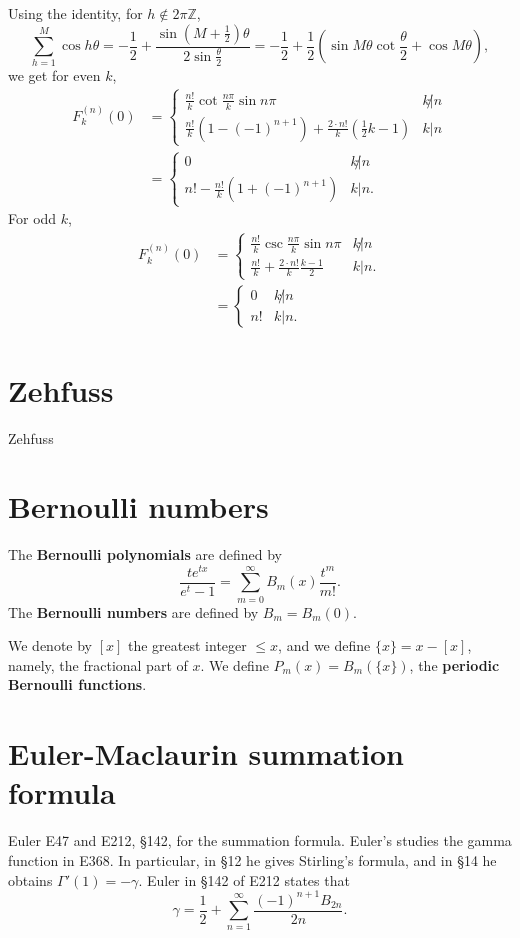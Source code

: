 \documentclass{amsart}
\begin{document}
Using the identity, for $h \not \in 2\pi \mathbb{Z}$,
\[
\sum_{h=1}^M \cos h\theta = - \frac{1}{2}+\frac{\sin\left(M+\frac{1}{2}\right)\theta}{2\sin\frac{\theta}{2}}
=-\frac{1}{2}+\frac{1}{2}\left(\sin M\theta \cot \frac{\theta}{2}+\cos M \theta\right),
\] 
we  get for even $k$,
\begin{align*}
F_k^{(n)}(0) &= \begin{cases}
\frac{n!}{k} \cot \frac{n\pi}{k} \sin n\pi&k \not | n\\
\frac{n!}{k}(1-(-1)^{n+1})
+\frac{2\cdot n!}{k} \left(\frac{1}{2}k-1\right)
&k  | n
\end{cases}\\
&=\begin{cases}
0&k \not | n\\
n!-\frac{n!}{k}(1+(-1)^{n+1})& k| n.
\end{cases}
\end{align*}
For odd $k$,
\begin{align*}
F_k^{(n)}(0) 
&=\begin{cases}
\frac{n!}{k} \csc \frac{n\pi}{k} \sin n\pi&k \not | n\\
\frac{n!}{k}+\frac{2\cdot n!}{k} \frac{k-1}{2}&k | n.
\end{cases}\\
&=\begin{cases}
0&k \not | n\\
n!&k|n.
\end{cases}
\end{align*}



\section{Zehfuss}
Zehfuss \cite{zehfuss}

\section{Bernoulli numbers}
The \textbf{Bernoulli polynomials} are defined by
\[
\frac{te^{tx}}{e^t-1} = \sum_{m=0}^\infty B_m(x) \frac{t^m}{m!}.
\]
The \textbf{Bernoulli numbers} are defined by $B_m=B_m(0)$. 

We denote by $[x]$ the greatest integer $\leq x$, and we define $\{x\}=x-[x]$, namely, the fractional part of $x$.
We define $P_m(x)=B_m(\{x\})$, the \textbf{periodic Bernoulli functions}.



\section{Euler-Maclaurin summation formula}
Euler E47 and E212, \S 142, for the summation formula. Euler's studies the gamma function in E368. In particular,
in \S 12 he gives Stirling's formula, and
in \S 14 he obtains $\Gamma'(1)=-\gamma$. 
Euler in \S 142 of E212 states that
\[
\gamma = \frac{1}{2}+\sum_{n=1}^\infty \frac{(-1)^{n+1}B_{2n}}{2n}.
\]
\end{document}
